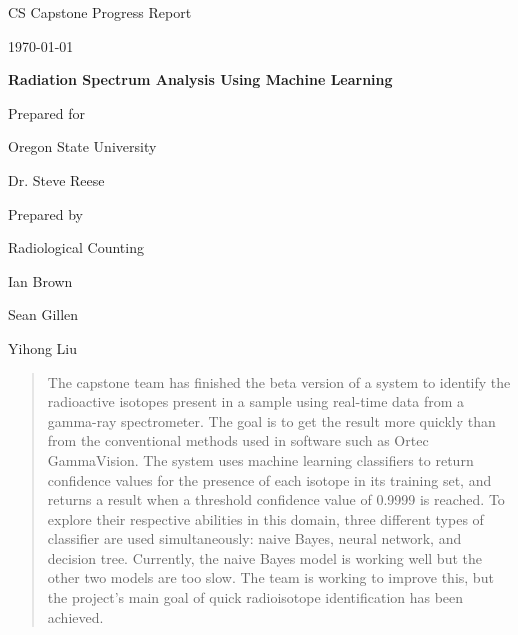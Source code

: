 \documentclass[onecolumn, draftclsnofoot,10pt, compsoc]{IEEEtran}
\def \GroupMemberOne{			Ian Brown}
\def \GroupMemberTwo{			Sean Gillen}
\def \GroupMemberThree{			Yihong Liu}
\def \CapstoneProjectName{		Radiation Spectrum Analysis Using Machine Learning}
\def \CapstoneSponsorCompany{	Oregon State University}
\def \CapstoneSponsorPerson{	Dr. Steve Reese}
\def \DocType{	%
				Progress Report
				}
\newcommand{\NameSigPair}[1]{\par
\makebox[2.75in][r]{#1} \hfil 	\makebox[3.25in]{\makebox[2.25in]{\hrulefill} \hfill		\makebox[.75in]{\hrulefill}}
\par\vspace{-12pt} \textit{\tiny\noindent
\makebox[2.75in]{} \hfil		\makebox[3.25in]{\makebox[2.25in][r]{Signature} \hfill	\makebox[.75in][r]{Date}}}}
\renewcommand{\NameSigPair}[1]{#1}
\begin{document}
\begin{titlepage}
    \begin{singlespace}
        \hfill 
        \par\vspace{.2in}
        \centering
        \scshape{
            \huge CS Capstone \DocType \par
            {\large\today}\par
            \vspace{.5in}
            \textbf{\Huge\CapstoneProjectName}\par
            \vfill
            {\large Prepared for}\par
            \Huge \CapstoneSponsorCompany \par
            \vspace{5pt}
            {\Large\NameSigPair{\CapstoneSponsorPerson}\par}
            {\large Prepared by }\par
            Radiological Counting\par
            \vspace{5pt}
            {\Large
                \NameSigPair{\GroupMemberOne}\par
                \NameSigPair{\GroupMemberTwo}\par
                \NameSigPair{\GroupMemberThree}\par
            }
            \vspace{20pt}
        }
        \begin{abstract}
        The capstone team has finished the beta version of a system to identify the radioactive isotopes present in a sample using real-time data from a gamma-ray spectrometer.
        The goal is to get the result more quickly than from the conventional methods used in software such as Ortec GammaVision.
        The system uses machine learning classifiers to return confidence values for the presence of each isotope in its training set, and returns a result when a threshold confidence value of 0.9999 is reached.
        To explore their respective abilities in this domain, three different types of classifier are used simultaneously: naive Bayes, neural network, and decision tree.
        Currently, the naive Bayes model is working well but the other two models are too slow.
        The team is working to improve this, but the project's main goal of quick radioisotope identification has been achieved.
        \end{abstract}
    \end{singlespace}
\end{titlepage}
\newpage
{}
\tableofcontents
\clearpage
\end{document}
